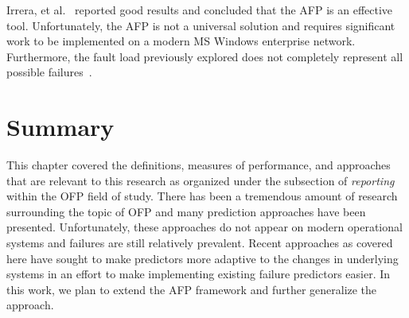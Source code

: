 Irrera, et al.~\cite{irrera2015} reported good results and concluded that the
\ac{AFP} is an effective tool.  Unfortunately, the \ac{AFP} is not a universal
solution and requires significant work to be implemented on a modern \ac{MS}
Windows enterprise network.  Furthermore, the fault load previously explored
does not completely represent all possible failures~\cite{kikuchi2014}.

\section{Summary} \label{summary}
This chapter covered the definitions, measures of performance, and approaches
that are relevant to this research as organized under the subsection of
\emph{reporting} within the \ac{OFP} field of study.  There has been a
tremendous amount of research surrounding the topic of \ac{OFP} and many
prediction approaches have been presented.  Unfortunately, these approaches do
not appear on modern operational systems and failures are still relatively
prevalent.  Recent approaches as covered here have sought to make predictors
more adaptive to the changes in underlying systems in an effort to make
implementing existing failure predictors easier.  In this work, we plan to
extend the \ac{AFP} framework and further generalize the
approach.  
